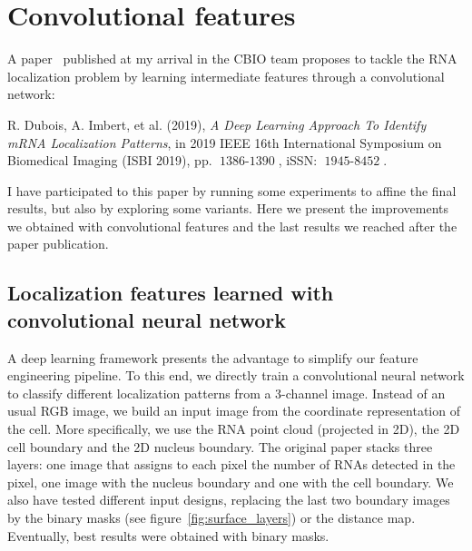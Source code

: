 
\graphicspath{{../../figures/appendix/}}

\chapter{Convolutional features}
\label{ch:convolutional_features}

\newpage

A paper~\cite{dubois_deep_2019} published at my arrival in the CBIO team proposes to tackle the \ac{RNA} localization problem by learning intermediate features through a convolutional network:

\begin{center}
	\color{green}
	R. Dubois, A. Imbert, et al. (2019), \textit{A Deep Learning Approach To Identify mRNA Localization Patterns}, in 2019 IEEE 16th International Symposium on Biomedical Imaging (ISBI 2019), pp. $\operatorname{1386-1390}$, iSSN: $\operatorname{1945-8452}$.
\end{center}

\noindent
I have participated to this paper by running some experiments to affine the final results, but also by exploring some variants.
Here we present the improvements we obtained with convolutional features and the last results we reached after the paper publication.

\section{Localization features learned with convolutional neural network}
\label{sec:learn_cnn_features}

A deep learning framework presents the advantage to simplify our feature engineering pipeline.
To this end, we directly train a convolutional neural network to classify different localization patterns from a 3-channel image.
Instead of an usual RGB image, we build an input image from the coordinate representation of the cell.
More specifically, we use the \ac{RNA} point cloud (projected in 2D), the 2D cell boundary and the 2D nucleus boundary.
The original paper stacks three layers: one image that assigns to each pixel the number of \ac{RNA}s detected in the pixel, one image with the nucleus boundary and one with the cell boundary.
We also have tested different input designs, replacing the last two boundary images by the binary masks (see figure~\ref{fig:surface_layers}) or the distance map.
Eventually, best results were obtained with binary masks.

